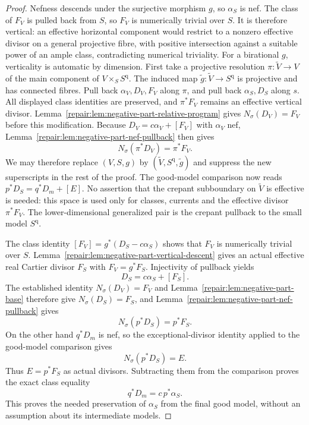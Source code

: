 \begin{proof}
Nefness descends under the surjective morphism $g$, so $\alpha_S$ is nef.
The class of $F_V$ is pulled back from $S$, so $F_V$ is numerically
trivial over $S$. It is therefore vertical: an effective horizontal
component would restrict to a nonzero effective divisor on a general
projective fibre, with positive intersection against a suitable power
of an ample class, contradicting numerical triviality. For a
birational $g$, verticality is automatic by dimension.
First take a projective resolution $\pi:\widetilde V\to V$ of the main
component of $V\times_S S^{\mathrm q}$. The induced map
$\widetilde g:\widetilde V\to S^{\mathrm q}$ is projective and has
connected fibres. Pull back $\alpha_V,D_V,F_V$ along $\pi$, and pull
back $\alpha_S,D_S$ along $s$. All displayed class identities are
preserved, and $\pi^*F_V$ remains an effective vertical divisor.
Lemma~\ref{repair:lem:negative-part-relative-program} gives
$N_\sigma(D_V)=F_V$ before this modification. Because
$D_V=c\alpha_V+[F_V]$ with $\alpha_V$ nef,
Lemma~\ref{repair:lem:negative-part-nef-pullback} then gives
\[
              N_\sigma(\pi^*D_V)=\pi^*F_V.
\]
We may therefore replace $(V,S,g)$ by
$(\widetilde V,S^{\mathrm q},\widetilde g)$ and suppress the new
superscripts in the rest of the proof. The good-model comparison now
reads $p^*D_S=q^*D_m+[E]$. No assertion that the crepant subboundary on
$\widetilde V$ is effective is needed: this space is used only for
classes, currents and the effective divisor $\pi^*F_V$. The
lower-dimensional generalized pair is the crepant pullback to the
small model $S^{\mathrm q}$.

The class identity $[F_V]=g^*(D_S-c\alpha_S)$ shows that $F_V$ is
numerically trivial over $S$. Lemma~\ref{repair:lem:negative-part-vertical-descent}
gives an actual effective real Cartier divisor $F_S$ with
$F_V=g^*F_S$. Injectivity of pullback yields
\[
                         D_S=c\alpha_S+[F_S].
\]
The established identity $N_\sigma(D_V)=F_V$ and
Lemma~\ref{repair:lem:negative-part-base} therefore give
$N_\sigma(D_S)=F_S$, and
Lemma~\ref{repair:lem:negative-part-nef-pullback} gives
\[
                         N_\sigma(p^*D_S)=p^*F_S.
\]
On the other hand $q^*D_m$ is nef, so the exceptional-divisor identity
applied to the good-model comparison gives
\[
                         N_\sigma(p^*D_S)=E.
\]
Thus $E=p^*F_S$ as actual divisors. Subtracting them from the comparison
proves the exact class equality
\[
                         q^*D_m=c\,p^*\alpha_S.
\]
This proves the needed preservation of $\alpha_S$ from the final good
model, without an assumption about its intermediate models.


\end{proof}
